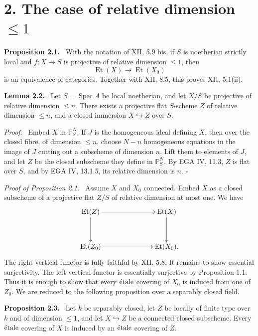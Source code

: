 \documentclass[12pt]{article}
\newcommand{\Spec}{\operatorname{Spec}}
\newcommand{\Et}{\operatorname{Et}}
\newcommand{\etale}{\ifmmode\textnormal{\'etale}\else\'etale\fi}
\newcommand{\qedtext}{\hfill\(\square\)}
\newenvironment{statement}[1]{\par\medskip\noindent\textbf{#1.}\ }{\par\medskip}
\newenvironment{prooftext}[1][Proof]{\par\noindent\emph{#1.}\ }{\par\medskip}
\begin{document}
\section*{2. The case of relative dimension \(\le1\)}

\begin{statement}{Proposition 2.1}
With the notation of XII, 5.9 bis, if \(S\) is noetherian strictly local and \(f:X\to S\) is projective of relative dimension \(\le1\), then
\[
\Et(X)\longrightarrow \Et(X_0)
\]
is an equivalence of categories. Together with XII, 8.5, this proves XII, 5.1(ii).
\end{statement}

\begin{statement}{Lemma 2.2}
Let \(S=\Spec A\) be local noetherian, and let \(X/S\) be projective of relative dimension \(\le n\). There exists a projective flat \(S\)-scheme \(Z\) of relative dimension \(\le n\), and a closed immersion \(X\hookrightarrow Z\) over \(S\).
\end{statement}

\begin{prooftext}
Embed \(X\) in \(\mathbb P^N_S\). If \(J\) is the homogeneous ideal defining \(X\), then over the closed fibre, of dimension \(\le n\), choose \(N-n\) homogeneous equations in the image of \(J\) cutting out a subscheme of dimension \(n\). Lift them to elements of \(J\), and let \(Z\) be the closed subscheme they define in \(\mathbb P^N_S\). By EGA IV, 11.3, \(Z\) is flat over \(S\), and by EGA IV, 13.1.5, its relative dimension is \(n\). \qedtext
\end{prooftext}

\begin{prooftext}[Proof of Proposition 2.1]
Assume \(X\) and \(X_0\) connected. Embed \(X\) as a closed subscheme of a projective flat \(Z/S\) of relative dimension at most one. We have
\[
\xymatrix@C=2.5cm@R=1.2cm{
\Et(Z)\ar[r]\ar[d]&\Et(X)\ar[d]\\
\Et(Z_0)\ar[r]&\Et(X_0).
}
\]
The right vertical functor is fully faithful by XII, 5.8. It remains to show essential surjectivity. The left vertical functor is essentially surjective by Proposition 1.1. Thus it is enough to show that every \(\etale\) covering of \(X_0\) is induced from one of \(Z_0\). We are reduced to the following proposition over a separably closed field.
\end{prooftext}

\begin{statement}{Proposition 2.3}
Let \(k\) be separably closed, let \(Z\) be locally of finite type over \(k\) and of dimension \(\le1\), and let \(X\hookrightarrow Z\) be a connected closed subscheme. Every \(\etale\) covering of \(X\) is induced by an \(\etale\) covering of \(Z\).
\end{statement}
\end{document}
